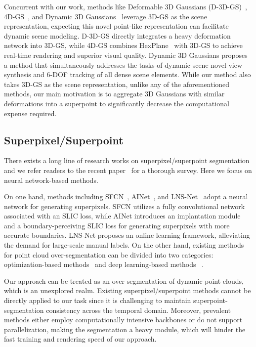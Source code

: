 Concurrent with our work, methods like Deformable 3D Gaussians (D-3D-GS)~\cite{Deformable3DGS}, 4D-GS~\cite{RealTime4DGS}, and Dynamic 3D Gaussians~\cite{Dynamic3DGS} leverage 3D-GS as the scene representation, expecting this novel point-like representation can facilitate dynamic scene modeling. D-3D-GS directly integrates a heavy deformation network into 3D-GS, while 4D-GS combines HexPlane~\cite{HexPlane} with 3D-GS to achieve real-time rendering and superior visual quality. Dynamic 3D Gaussians proposes a method that simultaneously addresses the tasks of dynamic scene novel-view synthesis and 6-DOF tracking of all dense scene elements. While our method also takes 3D-GS as the scene representation, unlike any of the aforementioned methods, our main motivation is to aggregate 3D Gaussians with similar deformations into a superpoint to significantly decrease the computational expense required.

\subsection{Superpixel/Superpoint}
There exists a long line of research works on superpixel/superpoint segmentation and we refer readers to the recent paper~\cite{J2023AnES} for a thorough survey. Here we focus on neural network-based methods. 

On one hand, methods including SFCN~\cite{SFCN}, AINet~\cite{AINet}, and LNS-Net~\cite{LNS-Net} adopt a neural network for generating superpixels. SFCN utilizes a fully convolutional network associated with an SLIC loss, while AINet introduces an implantation module and a boundary-perceiving SLIC loss for generating superpixels with more accurate boundaries. LNS-Net proposes an online learning framework, alleviating the demand for large-scale manual labels. On the other hand, existing methods for point cloud over-segmentation can be divided into two categories: optimization-based methods~\cite{Papon2013VoxelCC, Lin2018TowardBB, Guinard2017WEAKLYSS, Landrieu2016CutPF} and deep learning-based methods ~\cite{Landrieu2019PointCO, Hui_2023_ICCV, Hui2021SuperpointNF}.

Our approach can be treated as an over-segmentation of dynamic point clouds, which is an unexplored realm. Existing superpixel/superpoint methods cannot be directly applied to our task since it is challenging to maintain superpoint-segmentation consistency across the temporal domain. Moreover, prevalent methods either employ computationally intensive backbones or do not support parallelization, making the segmentation a heavy module, which will hinder the fast training and rendering speed of our approach.